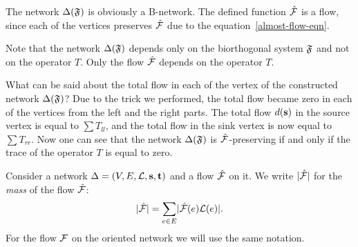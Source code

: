 \documentclass[12pt]{amsart}
\begin{document}
    The network $\Delta(\mathfrak{F})$ is obviously a B-network.
    The defined function $\mathcal{\hat{F}}$ is a flow, since each of the vertices preserves
      $\mathcal{\hat{F}}$ due to the equation~\eqref{almost-flow-eqn}.
    \begin{remark}
      Note that the network $\Delta(\mathfrak{F})$ depends only on the biorthogonal system $\mathfrak{F}$ and not on the operator $T$.
      Only the flow $\mathcal{\hat{F}}$ depends on the operator $T$.
    \end{remark}
    What can be said about the total flow in each of the vertex of the constructed network $\Delta(\mathfrak{F})$?
    Due to the trick we performed, the total flow became zero in each of the vertices from the left and the right parts.
    The total flow $d(\mathbf{s})$ in the source vertex is equal to $\sum T_{ll}$, and the total flow in the
      sink vertex is now equal to $\sum T_{rr}$.
    Now one can see that the network $\Delta(\mathfrak{F})$ is $\mathcal{\hat{F}}$-preserving if and only if the trace of the operator $T$ is equal to zero.
    \begin{definition}
      Consider a network $\Delta = (V, E, \mathcal{L}, \mathbf{s}, \mathbf{t})$ and a flow $\mathcal{\hat{F}}$ on it.
      We write $\lvert\mathcal{\hat{F}}\rvert$ for the \emph{mass} of the flow $\mathcal{\hat{F}}$:
      \[
        \lvert\mathcal{\hat{F}}\rvert = \sum_{e \in E} \lvert\mathcal{\hat{F}}(e) \mathcal{L}(e)\rvert.
      \]
      For the flow $\mathcal{F}$ on the oriented network we will use the same notation.
    \end{definition}
\end{document}
